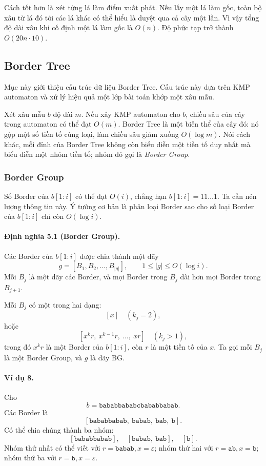 \documentclass[11pt]{article}
\begin{document}
Cách tốt hơn là xét từng lá làm điểm xuất phát. Nếu lấy một lá làm gốc, toàn bộ
xâu từ lá đó tới các lá khác có thể hiểu là duyệt qua cả cây một lần. Vì vậy
tổng độ dài xâu khi cố định một lá làm gốc là \(O(n)\). Độ phức tạp trở thành
\(O(20n\cdot 10)\).

\subsection{Border Tree}

Mục này giới thiệu cấu trúc dữ liệu Border Tree. Cấu trúc này dựa trên KMP
automaton và xử lý hiệu quả một lớp bài toán khớp một xâu mẫu.

Xét xâu mẫu \(b\) độ dài \(m\). Nếu xây KMP automaton cho \(b\), chiều sâu của
cây trong automaton có thể đạt \(O(m)\). Border Tree là một biến thể của cây đó:
nó gộp một số tiền tố cùng loại, làm chiều sâu giảm xuống \(O(\log m)\). Nói
cách khác, mỗi đỉnh của Border Tree không còn biểu diễn một tiền tố duy nhất mà
biểu diễn một nhóm tiền tố; nhóm đó gọi là \emph{Border Group}.

\subsubsection{Border Group}

Số Border của \(b[1:i]\) có thể đạt \(O(i)\), chẳng hạn \(b[1:i]=11\ldots1\).
Ta cần nén lượng thông tin này. Ý tưởng cơ bản là phân loại Border sao cho số
loại Border của \(b[1:i]\) chỉ còn \(O(\log i)\).

\paragraph{Định nghĩa 5.1 (Border Group).}
Các Border của \(b[1:i]\) được chia thành một dãy
\[
  g=[B_1,B_2,\ldots,B_{|g|}],\qquad 1\le |g|\le O(\log i).
\]
Mỗi \(B_j\) là một dãy các Border, và mọi Border trong \(B_j\) dài hơn mọi
Border trong \(B_{j+1}\).

Mỗi \(B_j\) có một trong hai dạng:
\[
  [x]\quad (k_j=2),
\]
hoặc
\[
  [x^k r,\ x^{k-1}r,\ \ldots,\ xr]\quad (k_j>1),
\]
trong đó \(x^kr\) là một Border của \(b[1:i]\), còn \(r\) là một tiền tố của
\(x\). Ta gọi mỗi \(B_j\) là một Border Group, và \(g\) là dãy BG.

\paragraph{Ví dụ 8.}
Cho
\[
  b=\texttt{bababbababcbababbabab}.
\]
Các Border là
\[
  [\texttt{bababbabab},\ \texttt{babab},\ \texttt{bab},\ \texttt{b}].
\]
Có thể chia chúng thành ba nhóm:
\[
  [\texttt{bababbabab}],\quad
  [\texttt{babab},\ \texttt{bab}],\quad
  [\texttt{b}].
\]
Nhóm thứ nhất có thể viết với \(r=\texttt{babab},x=\varepsilon\); nhóm thứ hai
với \(r=\texttt{ab},x=\texttt{b}\); nhóm thứ ba với \(r=\texttt{b},x=\varepsilon\).
\end{document}
